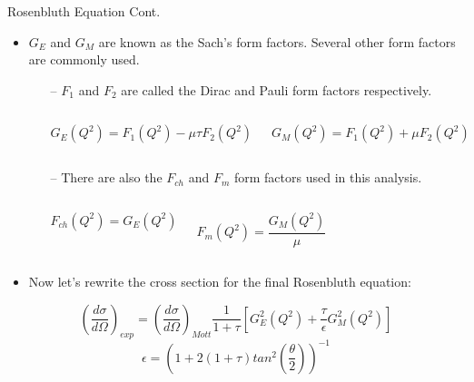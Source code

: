 \documentclass[10pt]{beamer}
\begin{document}
\begin{frame}[fragile]{Rosenbluth Equation Cont.}
	\begin{itemize}
		\item \alert{$G_E$} and \alert{$G_M$} are known as the \alert{Sach's form factors}. Several other form factors are commonly used.
			\begin{itemize}
				\pause
				\item[--] \alert{$F_1$} and  \alert{$F_2$} are called the  \alert{Dirac} and  \alert{Pauli} form factors respectively.
				\begin{columns}[T,onlytextwidth]   	
					\begin{equation} \label{eq:f1}
						G_E \left(Q^2\right) = F_1\left(Q^2\right) -\mu \tau F_2\left(Q^2\right)
					\end{equation}
					
					\begin{equation} \label{eq:f2}
						G_M \left(Q^2\right) = F_1\left(Q^2\right) + \mu F_2\left(Q^2\right)
					\end{equation}
				\end{columns}
				
				\pause
				\item[--] There are also the \alert{$F_{ch}$} and \alert{$F_m$} form factors used in this analysis.
				\begin{columns}[T,onlytextwidth]   	
					\begin{equation} \label{eq:fch}
						F_{ch}\left(Q^2\right) = G_E \left(Q^2\right) 
					\end{equation}

					\begin{equation} \label{eq:fm}
						F_{m}\left(Q^2\right) = \frac{G_M \left(Q^2\right)}{\mu} 
					\end{equation}
				\end{columns}
			\end{itemize}
			
			\pause
			\item Now let's rewrite the cross section for the final \alert{Rosenbluth equation}:
	\end{itemize}
	\begin{equation} \label{eq:rosenbluth}
		\left(\frac{d\sigma}{d\Omega}\right)_{exp} = \left( \frac{d\sigma}{d\Omega} \right)_{Mott} \frac{1}{1+\tau}\left[ G_E^2\left(Q^2\right) + \frac{\tau}{\epsilon} G_M^2\left(Q^2\right) \right]
	\end{equation}
	\begin{equation} \label{eq:epsilon}
		\epsilon = \left( 1 + 2(1+\tau)tan^2\left( \frac{\theta}{2} \right) \right)^{-1}
	\end{equation}
\end{frame}
\end{document}
